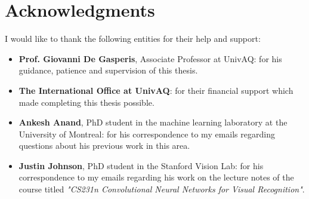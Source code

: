 \documentclass[a4paper, 12pt]{report}
\begin{document}
\chapter*{Acknowledgments}
I would like to thank the following entities for their help and support:
\begin{itemize}
	\item \textbf{Prof. Giovanni De Gasperis}, Associate Professor at UnivAQ: for his guidance, patience and supervision of this thesis.
	\item \textbf{The International Office at UnivAQ}: for their financial support which made completing this thesis possible.
	\item \textbf{Ankesh Anand}, PhD student in the machine learning laboratory at the University of Montreal: for his correspondence to my emails regarding questions about his previous work in this area\citep{ankeshanand/neural-cryptography-tensorflow}.
	\item \textbf{Justin Johnson}, PhD student in the Stanford Vision Lab: for his correspondence to my emails regarding his work on the lecture notes of the course titled \textit{"CS231n Convolutional Neural Networks for Visual Recognition"}\citep{cs231n}.
\end{itemize}
\newpage
\medskip


\end{document}
